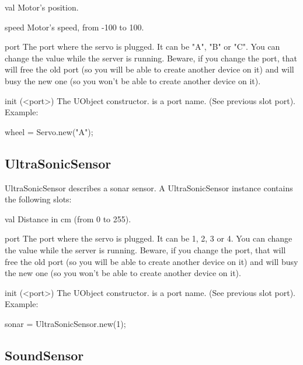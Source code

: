 \begin{urbiscriptapi}
\item[val] Motor's position.

\item[speed] Motor's speed, from -100 to 100.

\item[port] The port where the servo is plugged. It can be "A", "B" or
  "C". You can change the value while the server is running. Beware, if you
  change the port, that will free the old port (so you will be able to
  create another device on it) and will busy the new one (so you won't be
  able to create another device on it).

\item[init](<port>) The UObject constructor.  is a port name. (See
  previous slot port). Example:
\begin{urbiunchecked}
wheel = Servo.new("A");
\end{urbiunchecked}
\end{urbiscriptapi}


\subsection{UltraSonicSensor}
UltraSonicSensor describes a sonar sensor. A UltraSonicSensor instance
contains the following slots:

\begin{urbiscriptapi}
\item[val] Distance in cm (from 0 to 255).

\item[port] The port where the servo is plugged. It can be 1, 2, 3 or 4. You
  can change the value while the server is running. Beware, if you change
  the port, that will free the old port (so you will be able to create
  another device on it) and will busy the new one (so you won't be able to
  create another device on it).

\item[init](<port>) The UObject constructor.  is a port name. (See
  previous slot port). Example:
\begin{urbiunchecked}
sonar = UltraSonicSensor.new(1);
\end{urbiunchecked}

\end{urbiscriptapi}

\subsection{SoundSensor}

